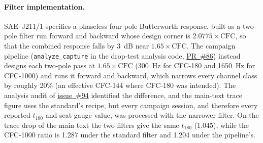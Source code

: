 \documentclass[11pt]{article}
\newcommand{\repo}{https://github.com/vertical-cloud-lab/tensegrity-optimization}
\begin{document}
\paragraph{Filter implementation.} SAE~J211/1 specifies a phaseless
four-pole Butterworth response, built as a two-pole filter run forward
and backward whose design corner is $2.0775 \times \mathrm{CFC}$, so that
the combined response falls by \SI{3}{dB} near $1.65 \times
\mathrm{CFC}$. The campaign pipeline (\texttt{analyze\_capture} in the
drop-test analysis code, \href{\repo/pull/86}{PR~\#86}) instead designs
each two-pole pass at $1.65 \times \mathrm{CFC}$ (\SI{300}{Hz} for
CFC-180 and \SI{1650}{Hz} for CFC-1000) and runs it forward and backward,
which narrows every channel class by roughly 20\% (an effective CFC-144
where CFC-180 was intended). The analysis audit of
\href{\repo/issues/94}{issue~\#94} identified the difference, and the
main-text trace figure uses the standard's
recipe, but every campaign session, and therefore every reported
$t_{180}$ and seat-gauge value, was processed with the narrower filter.
On the trace drop of the main text the two filters give the same
$t_{180}$ (1.045), while the CFC-1000 ratio is 1.287 under the standard
filter and 1.204 under the pipeline's.
\end{document}
